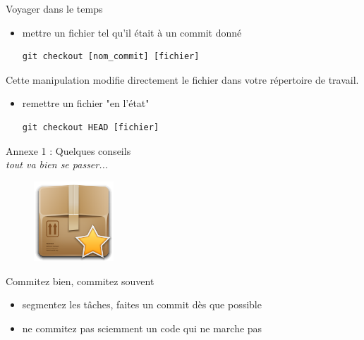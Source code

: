 \documentclass{beamer}
\begin{document}
\begin{frame}[fragile]{Voyager dans le temps}
	\begin{itemize}
		\item mettre un fichier tel qu'il était à un commit donné
		\begin{lstlisting}[frame=single]
		git checkout [nom_commit] [fichier]
		\end{lstlisting}
	\end{itemize}
	Cette manipulation modifie directement le fichier dans votre répertoire de travail.	
		
	\begin{itemize}
		\item remettre un fichier "en l'état"
		\begin{lstlisting}[frame=single]
		git checkout HEAD [fichier]
		\end{lstlisting}
	\end{itemize}	
\end{frame}


\begin{frame}
	\begin{center}
 		\Large{Annexe 1 : Quelques conseils}\\
 		{\small  \textit{tout va bien se passer...}}
	\end{center}

	\begin{figure}
		\centering
		\includegraphics[height=3cm]{img/bonus}
	\end{figure}
\end{frame}

\begin{frame}{Commitez bien, commitez souvent}

	\begin{itemize}
		\item segmentez les tâches, faites un commit dès que possible
		\item ne commitez pas sciemment un code qui ne marche pas
	\end{itemize}
	
\end{frame}
\end{document}
